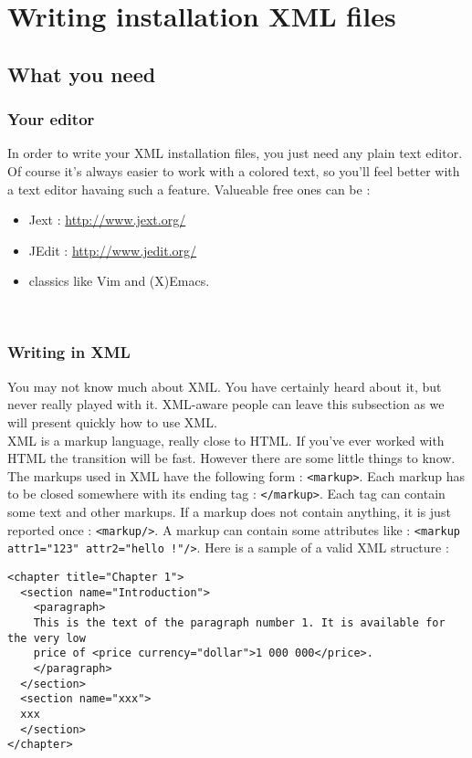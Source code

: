 \chapter{Writing installation XML files}

\section{What you need}

\subsection{Your editor}

In order to write your XML installation files, you just need any plain text
editor. Of course it's always easier to work with a colored text, so you'll feel
better with a text editor havaing such a feature. Valueable free ones can be :
\begin{itemize}
  \item Jext : \url{http://www.jext.org/}
  \item JEdit : \url{http://www.jedit.org/}
  \item classics like Vim and (X)Emacs.
\end{itemize}\

\subsection{Writing in XML}

You may not know much about XML. You have certainly heard about it, but never
really played with it. XML-aware people can leave this subsection as we will
present quickly how to use XML.\\

XML is a markup language, really close to HTML. If you've ever worked with HTML
the transition will be fast. However there are some little things to know. The
markups used in XML have the following form : \texttt{<markup>}. Each markup has
to be closed somewhere with its ending tag : \texttt{</markup>}. Each tag can
contain some text and other markups. If a markup does not contain anything, it
is just reported once : \texttt{<markup/>}. A markup can contain some attributes
like : \texttt{<markup attr1="123" attr2="hello !"/>}. Here is a sample of a
valid XML structure :
\footnotesize
\begin{verbatim}
<chapter title="Chapter 1">
  <section name="Introduction">
    <paragraph>
    This is the text of the paragraph number 1. It is available for the very low
    price of <price currency="dollar">1 000 000</price>.
    </paragraph>
  </section>
  <section name="xxx">
  xxx
  </section>
</chapter>
\end{verbatim}
\normalsize

